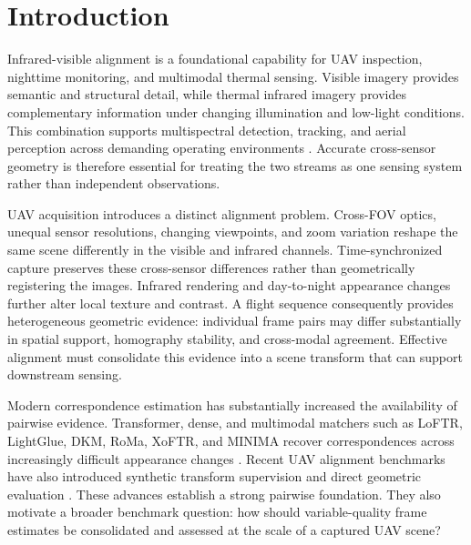 
\section{Introduction}

Infrared-visible alignment is a foundational capability for UAV inspection, nighttime monitoring,
and multimodal thermal sensing. Visible imagery provides semantic and structural detail, while
thermal infrared imagery provides complementary information under changing illumination and
low-light conditions. This combination supports multispectral detection, tracking, and
aerial perception across demanding operating environments
\cite{hwang2015kaist,flir2018thermal,jia2021llvip,liu2022tardal,sun2022dronevehicle,zhang2022vtuav,li2022lasher,jiang2023antiuav}.
Accurate cross-sensor geometry is therefore essential for treating the two streams as one sensing
system rather than independent observations.

UAV acquisition introduces a distinct alignment problem. Cross-FOV optics, unequal sensor
resolutions, changing viewpoints, and zoom variation reshape the same scene differently in the
visible and infrared channels. Time-synchronized capture preserves these cross-sensor differences
rather than geometrically registering the images. Infrared rendering and day-to-night appearance changes further
alter local texture and contrast. A flight sequence consequently provides heterogeneous geometric
evidence: individual frame pairs may differ substantially in spatial support, homography
stability, and cross-modal agreement. Effective alignment must consolidate this evidence into a
scene transform that can support downstream sensing.

Modern correspondence estimation has substantially increased the availability of pairwise
evidence. Transformer, dense, and multimodal matchers such as LoFTR, LightGlue, DKM, RoMa, XoFTR,
and MINIMA recover correspondences across increasingly difficult appearance changes
\cite{sarlin2020superglue,sun2021loftr,chen2022aspanformer,lindenberger2023lightglue,edstedt2023dkm,edstedt2024roma,tuzcuoglu2024xoftr,ren2025minima}.
Recent UAV alignment benchmarks have also introduced synthetic transform supervision and direct
geometric evaluation \cite{gao2025uavmatch}. These advances establish a strong pairwise
foundation. They also motivate a broader benchmark question: how should variable-quality frame
estimates be consolidated and assessed at the scale of a captured UAV scene?

